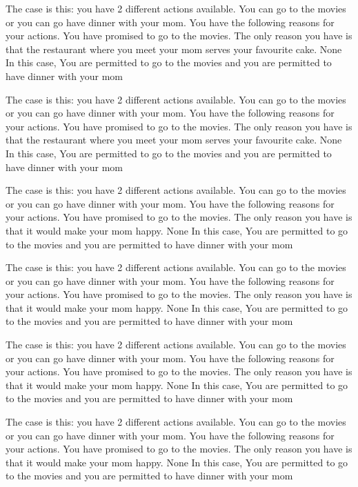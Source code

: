 The case is this: you have  2  different actions available.  You can go to the movies or you can go have dinner with your mom.
You have the following reasons for your actions.  You have promised to go to the movies. The only reason you have is that the restaurant where you meet your mom serves your favourite cake. 
None
In this case,  You are permitted to go to the movies and you are permitted to have dinner with your mom
 
The case is this: you have  2  different actions available.  You can go to the movies or you can go have dinner with your mom.
You have the following reasons for your actions.  You have promised to go to the movies. The only reason you have is that the restaurant where you meet your mom serves your favourite cake. 
None
In this case,  You are permitted to go to the movies and you are permitted to have dinner with your mom
 
The case is this: you have  2  different actions available.  You can go to the movies or you can go have dinner with your mom.
You have the following reasons for your actions.  You have promised to go to the movies. The only reason you have is that it would make your mom happy. 
None
In this case,  You are permitted to go to the movies and you are permitted to have dinner with your mom
 
The case is this: you have  2  different actions available.  You can go to the movies or you can go have dinner with your mom.
You have the following reasons for your actions.  You have promised to go to the movies. The only reason you have is that it would make your mom happy. 
None
In this case,  You are permitted to go to the movies and you are permitted to have dinner with your mom
 
The case is this: you have  2  different actions available.  You can go to the movies or you can go have dinner with your mom.
You have the following reasons for your actions.  You have promised to go to the movies. The only reason you have is that it would make your mom happy. 
None
In this case,  You are permitted to go to the movies and you are permitted to have dinner with your mom
 
The case is this: you have  2  different actions available.  You can go to the movies or you can go have dinner with your mom.
You have the following reasons for your actions.  You have promised to go to the movies. The only reason you have is that it would make your mom happy. 
None
In this case,  You are permitted to go to the movies and you are permitted to have dinner with your mom
 
